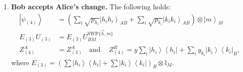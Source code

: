 \documentclass{article}
\begin{document}
\begin{enumerate}
\begin{proof}
          which is also block diagonal with respect to $\mathcal{H}\oplus \mathcal{H}^{\perp}$ and has only term I in the first block. Consequently,
          only on these will $U_{(2)}$ have a non-trivial action (as $U_{(2)}$ is of the form $\begin{bmatrix} U &0\\ 0 &\mathbb{I}_{\mathcal{H}^\perp} \end{bmatrix}$ wrt $\mathcal{H}\oplus\mathcal{H}^\perp$). Let us first evaluate
          the non-$\mathcal{H}$ part where we only need to apply the projector.
          The result after separating equations where possible is
          \begin{align*}
            \sum x_{h_{i}}\left|h_{i}\right\rangle \left\langle h_{i}\right|\otimes\left(\mathbb{I}-\left|h_{i}\right\rangle \left\langle h_{i}\right|\right)  \ge0, \text{ and }
            \sum(x_{k_{i}}-x_{k_{i}})\left|k_{i}\right\rangle \left\langle k_{i}\right|\otimes\mathbb{I}  \ge0,
          \end{align*}
          which imply
          $
            x_{h_{i}}\ge0.
          $
          The non-trivial part yields
          \begin{displaymath}
            \sum x_{h_{i}}\left|h_{i}h_{i}\right\rangle \left\langle h_{i}h_{i}\right|\ge\sum x_{g_{i}}E_{(2)}U_{(2)}\left|g_{i}g_{i}\right\rangle \left\langle g_{i}g_{i}\right|U_{(2)}^{\dagger}E_{(2)}
          \end{displaymath}
          completing the proof.
        \end{proof}
  \item \textbf{Bob accepts Alice's change.} The following holds:
        \begin{align*}
          \left|\psi_{(4)}\right\rangle & =\left(\sum_{i}\sqrt{p_{h_{i}}}\left|h_{i}h_{i}\right\rangle _{AB}+\sum_{i}\sqrt{p_{k_{i}}}\left|k_{i}k_{i}\right\rangle _{AB}\right)\otimes\left|m\right\rangle _{M} \\
          E_{(3)}U_{(3)}                & =E_{(3)}U_{BM}^{\text{SWP}\{\vec{h},m\}}                                                                                                                              \\
          Z_{(4)}^{A}                   & =Z_{(3)}^{A} \ \ \ \text{ and }\ \ \ \
          Z_{(4)}^{B}  =y\sum_{i}\left|h_{i}\right\rangle \left\langle h_{i}\right|+\sum_{i}y_{k_{i}}\left|k_{i}\right\rangle \left\langle k_{i}\right|_{B},
        \end{align*}
        where $E_{(3)}=\left(\sum\left|h_{i}\right\rangle \left\langle h_{i}\right|+\sum\left|k_{i}\right\rangle \left\langle k_{i}\right|\right)_{B}\otimes\mathbb{I}_{M}$.

\end{enumerate}
\end{document}
